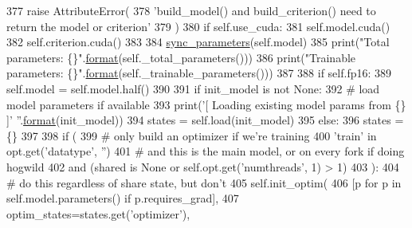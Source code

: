 \begin{DoxyCode}
377                 \textcolor{keywordflow}{raise} AttributeError(
378                     \textcolor{stringliteral}{'build\_model() and build\_criterion() need to return the model or criterion'}
379                 )
380             \textcolor{keywordflow}{if} self.use\_cuda:
381                 self.model.cuda()
382                 self.criterion.cuda()
383 
384             \hyperlink{namespaceparlai_1_1utils_1_1distributed_a47e6d93d849e487d7d3f6e1a83468073}{sync\_parameters}(self.model)
385             print(\textcolor{stringliteral}{"Total parameters: \{\}"}.\hyperlink{namespaceparlai_1_1chat__service_1_1services_1_1messenger_1_1shared__utils_a32e2e2022b824fbaf80c747160b52a76}{format}(self.\_total\_parameters()))
386             print(\textcolor{stringliteral}{"Trainable parameters:  \{\}"}.\hyperlink{namespaceparlai_1_1chat__service_1_1services_1_1messenger_1_1shared__utils_a32e2e2022b824fbaf80c747160b52a76}{format}(self.\_trainable\_parameters()))
387 
388             \textcolor{keywordflow}{if} self.fp16:
389                 self.model = self.model.half()
390 
391             \textcolor{keywordflow}{if} init\_model \textcolor{keywordflow}{is} \textcolor{keywordflow}{not} \textcolor{keywordtype}{None}:
392                 \textcolor{comment}{# load model parameters if available}
393                 print(\textcolor{stringliteral}{'[ Loading existing model params from \{\} ]'} \textcolor{stringliteral}{''}.\hyperlink{namespaceparlai_1_1chat__service_1_1services_1_1messenger_1_1shared__utils_a32e2e2022b824fbaf80c747160b52a76}{format}(init\_model))
394                 states = self.load(init\_model)
395             \textcolor{keywordflow}{else}:
396                 states = \{\}
397 
398         \textcolor{keywordflow}{if} (
399             \textcolor{comment}{# only build an optimizer if we're training}
400             \textcolor{stringliteral}{'train'} \textcolor{keywordflow}{in} opt.get(\textcolor{stringliteral}{'datatype'}, \textcolor{stringliteral}{''})
401             \textcolor{comment}{# and this is the main model, or on every fork if doing hogwild}
402             \textcolor{keywordflow}{and} (shared \textcolor{keywordflow}{is} \textcolor{keywordtype}{None} \textcolor{keywordflow}{or} self.opt.get(\textcolor{stringliteral}{'numthreads'}, 1) > 1)
403         ):
404             \textcolor{comment}{# do this regardless of share state, but don't}
405             self.init\_optim(
406                 [p \textcolor{keywordflow}{for} p \textcolor{keywordflow}{in} self.model.parameters() \textcolor{keywordflow}{if} p.requires\_grad],
407                 optim\_states=states.get(\textcolor{stringliteral}{'optimizer'}),

\end{DoxyCode}
